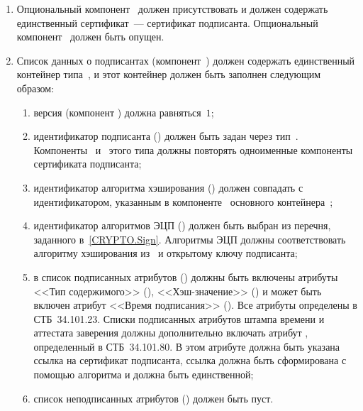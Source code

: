 \begin{enumerate}
Первый идентификатор определен в СТБ~34.101.82, второй~--- в СТБ~
34.101.81, остальные~--- в приложении~\ref{ASN1}.

\item
Опциональный компонент~ должен присутствовать и 
должен содержать единственный сертификат~--- сертификат подписанта.
%
Опциональный компонент~ должен быть опущен.

\item
Список данных о подписантах (компонент~) должен содержать
единственный контейнер типа~, и этот контейнер должен быть
заполнен следующим образом:
\begin{enumerate}
\item
версия (компонент ) должна равняться~$1$;
\item
идентификатор подписанта () должен быть задан через
тип~. Компоненты~ и~
этого типа должны повторять одноименные компоненты сертификата подписанта;
\item
идентификатор алгоритма хэширования () должен совпадать с
идентификатором, указанным в компоненте~ основного
контейнера~;
\item
идентификатор алгоритмов ЭЦП () должен быть выбран из
перечня, заданного в~\ref{CRYPTO.Sign}. Алгоритмы ЭЦП должны соответствовать
алгоритму хэширования из~ и открытому ключу подписанта;
\item
в список подписанных атрибутов () должны быть включены
атрибуты <<Тип содержимого>> (), <<Хэш-значение>>
() и может быть включен атрибут <<Время подписания>>
(). Все атрибуты определены в СТБ~34.101.23.
%
Списки подписанных атрибутов штампа времени и аттестата заверения должны
дополнительно включать атрибут , определенный в
СТБ~34.101.80. В этом атрибуте должна быть указана ссылка на сертификат
подписанта, ссылка должна быть сформирована с помощью алгоритма 
и должна быть единственной;
\item
список неподписанных атрибутов () должен быть пуст.
\end{enumerate}
\end{enumerate}
